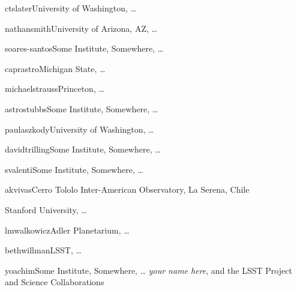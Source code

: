 \author{Colin Slater}{ctslater}{University of Washington, \ldots}
\author{Nathan Smith}{nathansmith}{University of Arizona, AZ, \ldots}
\author{Marcelles Soares-Santos}{soares-santos}{Some Institute, Somewhere, \ldots}
\author{Jay Strader}{caprastro}{Michigan State, \ldots}
\author{Michael Strauss}{michaelstrauss}{Princeton, \ldots}
\author{Christopher Stubbs}{astrostubbs}{Some Institute, Somewhere, \ldots}
\author{Paula Szkody}{paulaszkody}{University of Washington, \ldots}
\author{David Trilling}{davidtrilling}{Some Institute, Somewhere, \ldots}
\author{Stefano Valenti}{svalenti}{Some Institute, Somewhere, \ldots}
\author{Kathy Vivas}{akvivas}{Cerro Tololo Inter-American Observatory, La Serena, Chile}
\author{Robert Wagoner}{}{Stanford University, \ldots}
\author{Lucianne Walkowicz}{lmwalkowicz}{Adler Planetarium, \ldots}
\author{Beth Willman}{bethwillman}{LSST, \ldots}
\author{Peter Yoachim}{yoachim}{Some Institute, Somewhere, \ldots}
{\it your name here},
{and the LSST Project and Science Collaborations}
